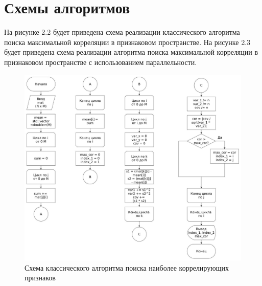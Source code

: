 \section{Схемы алгоритмов}
На рисунке 2.2 будет приведена схема реализации классического алгоритма поиска максимальной корреляции в признаковом пространстве.
На рисунке 2.3 будет приведена схема реализации алгоритма поиска максимальной корреляции в признаковом пространстве с использованием параллельности.

\FloatBarrier
\begin{figure}[hp]
	\label{classic}
	\begin{center}
		\includegraphics[width=\linewidth]{graph/classic.jpg}
	\end{center}
	\caption{Схема классического алгоритма поиска наиболее коррелирующих признаков}
\end{figure}
\FloatBarrier

